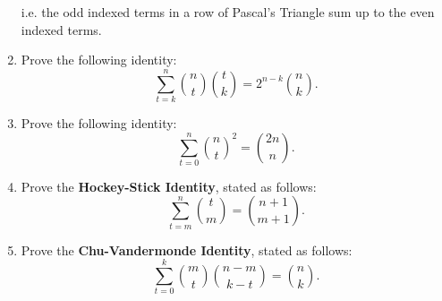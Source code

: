 \documentclass[12pt]{article}
\begin{document}
\begin{enumerate}
\[        \]
        i.e. the odd indexed terms in a row of Pascal's Triangle sum up to the even indexed terms.
        \item Prove the following identity:
        \[
            \sum_{t = k}^{n} \binom{n}{t} \binom{t}{k} = 2^{n - k} \binom{n}{k}.
        \]
        \item Prove the following identity:
        \[
            \sum_{t = 0}^{n} \binom{n}{t}^2 = \binom{2n}{n}.
        \]
        \item Prove the \textbf{Hockey-Stick Identity}, stated as follows:
        \[
            \sum_{t = m}^{n} \binom{t}{m} = \binom{n + 1}{m+1}.
        \]
        \item Prove the \textbf{Chu-Vandermonde Identity}, stated as follows:
        \[
            \sum_{t = 0}^{k} \binom{m}{t}\binom{n-m}{k-t} = \binom{n}{k}.
        \]

    \end{enumerate}
\end{document}
